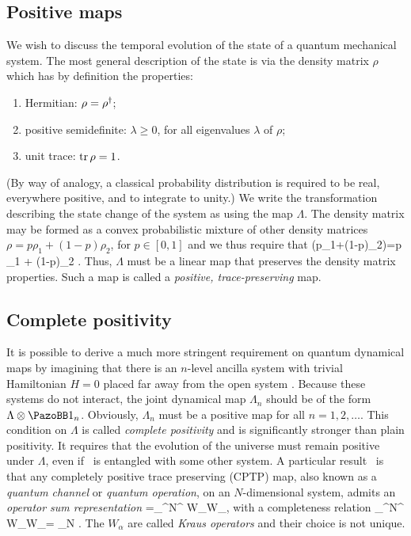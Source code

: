 \subsection{Positive maps}
We wish to discuss the temporal evolution of the state of a quantum mechanical system. The most general description of the state is via the density matrix $\rho$ which has by definition the properties:
\begin{enumerate}
    \item Hermitian: $\rho=\rho^{\dag}$;
    \item positive semidefinite: $\lambda\ge0$, for all eigenvalues $\lambda$ of $\rho$;
    \item unit trace: $\operatorname{tr} \rho=1$.
\end{enumerate}
(By way of analogy, a classical probability distribution is required to be real, everywhere positive, and to integrate to unity.) We write the transformation describing the state change of the system as
\be
    \rho\mapsto\Lambda\rho
\ee
using the map $\Lambda$. The density matrix may be formed as a convex probabilistic mixture of other density matrices $\rho=p\rho_1+(1-p)\rho_2$, for $p\in[0,1]$ and we thus require that
\be
    \Lambda(p\rho_1+(1-p)\rho_2)=p \Lambda \rho_1 + (1-p)\Lambda\rho_2 .
\ee
Thus, $\Lambda$ must be a linear map that preserves the density matrix properties. Such a map is called a \emph{positive, trace-preserving} map.

\subsection{Complete positivity}
\label{sec:ancilla}
It is possible to derive a much more stringent requirement on quantum dynamical maps by imagining that there is an $n$-level ancilla system with trivial Hamiltonian $H=0$ placed far away from the open system \SSS\@. Because these systems do not interact, the joint dynamical map $\Lambda_n$ should be of the form $\Lambda\otimes\openone_n$. Obviously, $\Lambda_n$ must be a positive map for all $n=1,2,\ldots.$ This condition on $\Lambda$ is called \emph{complete positivity} and is significantly stronger than plain positivity. It requires that the evolution of the universe must remain positive under $\Lambda$, even if \SSS\ is entangled with some other system. A particular result~\cite{nielsen_chuang} is that any completely positive trace preserving (CPTP) map, also known as a \emph{quantum channel} or \emph{quantum operation}, on an $N$-dimensional system, admits an \emph{operator sum representation}
\be
    \label{eq:OSR}
    \Lambda \rho=\sum_{}^{N^{}} W\pdg_\alpha\rho W\dg_\alpha ,
\ee
with a completeness relation
\be
    \label{eq:OSR2}
    \sum_{}^{N^{}} W\dg_\alpha W\pdg_\alpha = \openone_N .
\ee
The $W_\alpha$ are called \emph{Kraus operators} and their choice is not unique.

